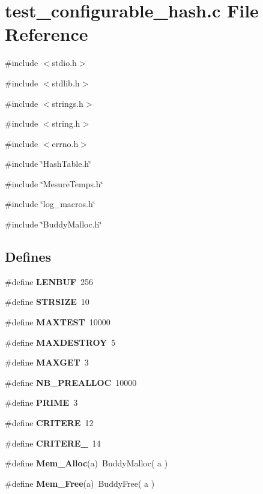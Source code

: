\section{test\_\-configurable\_\-hash.c File Reference}
\label{test__configurable__hash_8c}
{\ttfamily \#include $<$stdio.h$>$}\par
{\ttfamily \#include $<$stdlib.h$>$}\par
{\ttfamily \#include $<$strings.h$>$}\par
{\ttfamily \#include $<$string.h$>$}\par
{\ttfamily \#include $<$errno.h$>$}\par
{\ttfamily \#include \char`\"{}HashTable.h\char`\"{}}\par
{\ttfamily \#include \char`\"{}MesureTemps.h\char`\"{}}\par
{\ttfamily \#include \char`\"{}log\_\-macros.h\char`\"{}}\par
{\ttfamily \#include \char`\"{}BuddyMalloc.h\char`\"{}}\par
\subsection*{Defines}
\begin{DoxyCompactItemize}
\item 
\#define {\bf LENBUF}~256
\item 
\#define {\bf STRSIZE}~10
\item 
\#define {\bf MAXTEST}~10000
\item 
\#define {\bf MAXDESTROY}~5
\item 
\#define {\bf MAXGET}~3
\item 
\#define {\bf NB\_\-PREALLOC}~10000
\item 
\#define {\bf PRIME}~3
\item 
\#define {\bf CRITERE}~12
\item 
\#define {\bf CRITERE\_}~14
\item 
\#define {\bf Mem\_\-Alloc}(a)~BuddyMalloc( a )
\item 
\#define {\bf Mem\_\-Free}(a)~BuddyFree( a )
\end{DoxyCompactItemize}
